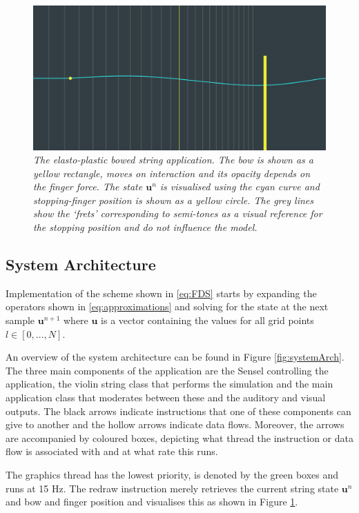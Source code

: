\documentclass[twoside,a4paper,dvipsnames]{article}
\begin{document}
\begin{figure}[ht]
\centerline{\includegraphics[width=1.0\columnwidth]{JUCEapp.png}}
\caption{\label{fig:application}{\it The elasto-plastic bowed string application. The bow is shown as a yellow rectangle, moves on interaction and its opacity depends on the finger force. The state $\mathbf{u}^n$ is visualised using the cyan curve and stopping-finger position is shown as a yellow circle. The grey lines show the `frets' corresponding to semi-tones as a visual reference for the stopping position and do not influence the model.}}
\end{figure}

\subsection{System Architecture}\label{sec:systemArch}
Implementation of the scheme shown in \eqref{eq:FDS} starts by expanding the operators shown in \eqref{eq:approximations} and solving for the state at the next sample $\mathbf{u}^{n+1}$ where $\mathbf{u}$ is a vector containing the values for all grid points $l\in[0,...,N]$.

An overview of the system architecture can be found in Figure \ref{fig:systemArch}. The three main components of the application are the Sensel controlling the application, the violin string class that performs the simulation and the main application class that moderates between these and the auditory and visual outputs. The black arrows indicate instructions that one of these components can give to another and the hollow arrows indicate data flows. Moreover, the arrows are accompanied by coloured boxes, depicting what thread the instruction or data flow is associated with and at what rate this runs. 

The graphics thread has the lowest priority, is denoted by the green boxes and runs at 15 Hz. The redraw instruction merely retrieves the current string state $\mathbf{u}^n$ and bow and finger position and visualises this as shown in Figure \ref{fig:application}.
\end{document}
